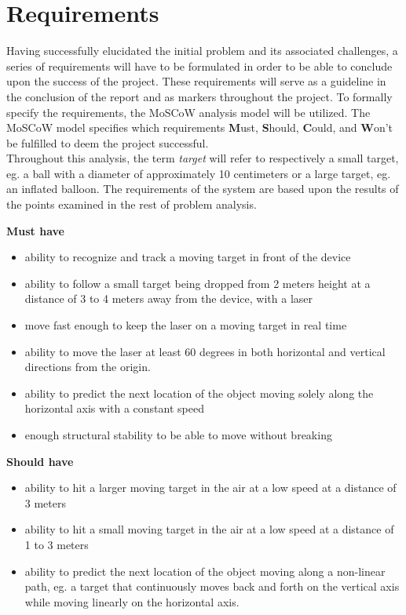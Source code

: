 \section{Requirements}
Having successfully elucidated the initial problem and its associated challenges, a series  of requirements will have to be formulated in order to be able to conclude upon the success of the project.
These requirements will serve as a guideline in the conclusion of the report and as markers throughout the project. 
To formally specify the requirements, the MoSCoW analysis model will be utilized. 
The MoSCoW model specifies which requirements \textbf{M}ust, \textbf{S}hould, \textbf{C}ould, and \textbf{W}on't be fulfilled to deem the project successful.\\
Throughout this analysis, the term \textit{target} will refer to respectively a small target, eg{.} a ball with a diameter of approximately 10 centimeters or a large target, eg{.} an inflated balloon.
The requirements of the system are based upon the results of the points examined in the rest of problem analysis.

\textbf{Must have}
\begin{itemize}
\item ability to recognize and track a moving target in front of the device
\item ability to follow a small target being dropped from 2 meters height at a distance of 3 to 4 meters away from the device, with a laser
\item move fast enough to keep the laser on a moving target in real time
\item ability to move the laser at least 60 degrees in both horizontal and vertical directions from the origin.
\item ability to predict the next location of the object moving solely along the horizontal axis with a constant speed
\item enough structural stability to be able to move without breaking
\end{itemize}

\textbf{Should have}
\begin{itemize}
\item ability to hit a larger moving target in the air at a low speed at a distance of 3 meters
\item ability to hit a small moving target in the air at a low speed at a distance of 1 to 3 meters
\item ability to predict the next location of the object moving along a non-linear path, eg{.} a target that continuously moves back and forth on the vertical axis while moving linearly on the horizontal axis.
\end{itemize}

